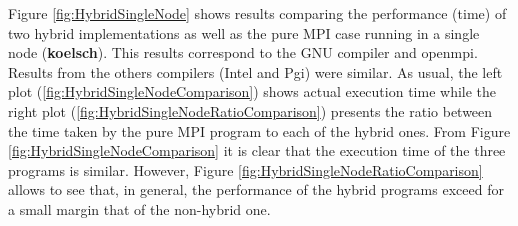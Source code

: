 Figure \ref{fig:HybridSingleNode} shows results comparing the performance (time) of two hybrid implementations as well as the pure MPI case running in a single node (\textbf{koelsch}). This results correspond to the GNU compiler and openmpi. Results from the others compilers (Intel and Pgi) were similar. As usual, the left plot (\ref{fig:HybridSingleNodeComparison}) shows actual execution time while the right plot (\ref{fig:HybridSingleNodeRatioComparison}) presents the ratio between the time taken by the pure MPI program to each of the hybrid ones. From Figure \ref{fig:HybridSingleNodeComparison} it is clear that the execution time of the three programs is similar. However, Figure \ref{fig:HybridSingleNodeRatioComparison} allows to see that, in general, the performance of the hybrid programs exceed for a small margin that of the non-hybrid one.

\medskip


